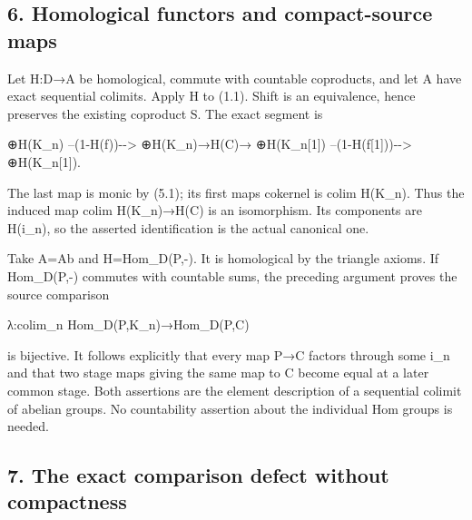\subsection{6. Homological functors and compact-source maps}\label{proofs-10139-10427-homological-functors-and-compact-source-maps}

Let H:\allowbreak{}D\allowbreak{}→A be homological,\allowbreak{} commute with countable coproducts,\allowbreak{} and let A have exact sequential colimits. Apply H to (1.1)\allowbreak{}. Shift is an equivalence,\allowbreak{} hence preserves the existing coproduct S. The exact segment is

\allowbreak{}⊕H(K\_\allowbreak{}n)\allowbreak{} --(1-H(f)\allowbreak{})\allowbreak{}-\allowbreak{}-> \allowbreak{}⊕H(K\_\allowbreak{}n)\allowbreak{}\allowbreak{}→H(C)\allowbreak{}\allowbreak{}→ \allowbreak{}⊕H(K\_\allowbreak{}n[1]\allowbreak{})\allowbreak{} --(1-H(f[1]\allowbreak{})\allowbreak{})\allowbreak{}-\allowbreak{}-> \allowbreak{}⊕H(K\_\allowbreak{}n[1]\allowbreak{})\allowbreak{}.

The last map is monic by (5.1)\allowbreak{}; its first map\textquotesingle s cokernel is colim H(K\_\allowbreak{}n)\allowbreak{}. Thus the induced map colim H(K\_\allowbreak{}n)\allowbreak{}\allowbreak{}→H(C)\allowbreak{} is an isomorphism. Its components are H(i\_\allowbreak{}n)\allowbreak{},\allowbreak{} so the asserted identification is the actual canonical one.

Take A\allowbreak{}=Ab and H\allowbreak{}=Hom\_\allowbreak{}D(P,\allowbreak{}-)\allowbreak{}. It is homological by the triangle axioms. If Hom\_\allowbreak{}D(P,\allowbreak{}-)\allowbreak{} commutes with countable sums,\allowbreak{} the preceding argument proves the source comparison

λ:\allowbreak{}colim\_\allowbreak{}n Hom\_\allowbreak{}D(P,\allowbreak{}K\_\allowbreak{}n)\allowbreak{}\allowbreak{}→Hom\_\allowbreak{}D(P,\allowbreak{}C)\allowbreak{}

is bijective. It follows explicitly that every map P\allowbreak{}→C factors through some i\_\allowbreak{}n and that two stage maps giving the same map to C become equal at a later common stage. Both assertions are the element description of a sequential colimit of abelian groups. No countability assertion about the individual Hom groups is needed.

\subsection{7. The exact comparison defect without compactness}\label{proofs-10139-10427-the-exact-comparison-defect-without-compactness}

